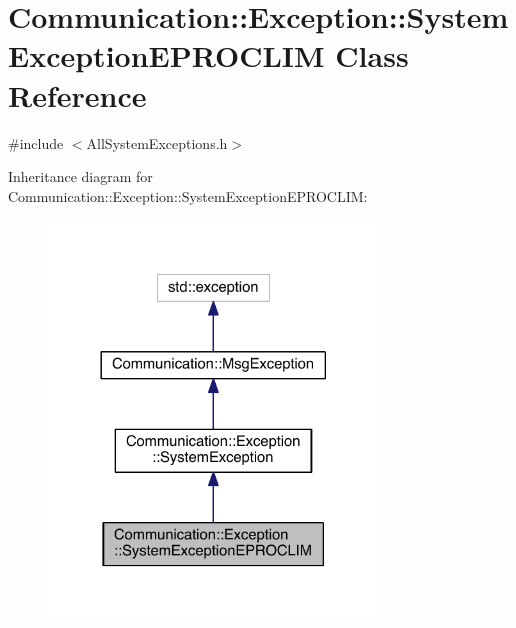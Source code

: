 \hypertarget{class_communication_1_1_exception_1_1_system_exception_e_p_r_o_c_l_i_m}{}\section{Communication\+:\+:Exception\+:\+:System\+Exception\+E\+P\+R\+O\+C\+L\+I\+M Class Reference}
\label{class_communication_1_1_exception_1_1_system_exception_e_p_r_o_c_l_i_m}


{\ttfamily \#include $<$All\+System\+Exceptions.\+h$>$}



Inheritance diagram for Communication\+:\+:Exception\+:\+:System\+Exception\+E\+P\+R\+O\+C\+L\+I\+M\+:\nopagebreak
\begin{figure}[H]
\begin{center}
\leavevmode
\includegraphics[width=248pt]{class_communication_1_1_exception_1_1_system_exception_e_p_r_o_c_l_i_m__inherit__graph}
\end{center}
\end{figure}



